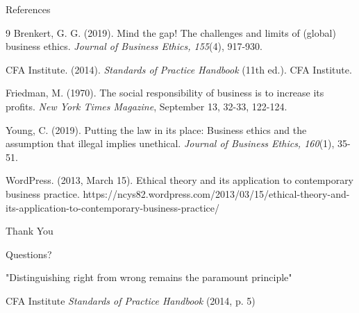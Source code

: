 \documentclass{beamer}
\renewcommand{\normalsize}{\fontsize{8pt}{10pt}\selectfont}
\renewcommand{\small}{\fontsize{7pt}{9pt}\selectfont}
\begin{document}
	\begin{frame}{References}
		\small
		\begin{thebibliography}{9}
			Brenkert, G. G. (2019). Mind the gap! The challenges and limits of (global) business ethics. \textit{Journal of Business Ethics, 155}(4), 917-930.
			
			CFA Institute. (2014). \textit{Standards of Practice Handbook} (11th ed.). CFA Institute.
			
			Friedman, M. (1970). The social responsibility of business is to increase its profits. \textit{New York Times Magazine}, September 13, 32-33, 122-124.
			
			Young, C. (2019). Putting the law in its place: Business ethics and the assumption that illegal implies unethical. \textit{Journal of Business Ethics, 160}(1), 35-51.
			
			WordPress. (2013, March 15). Ethical theory and its application to contemporary business practice. https://ncys82.wordpress.com/2013/03/15/ethical-theory-and-its-application-to-contemporary-business-practice/
		\end{thebibliography}
	\end{frame}
	
	\begin{frame}{Thank You}
		\begin{center}
			\Huge \textcolor{cfablue}{Questions?}
			
			\vspace{0.5cm}
			\Large \textcolor{cfagold}{"Distinguishing right from wrong remains the paramount principle"}
			
			\vspace{0.5cm}
			\normalsize CFA Institute \textit{Standards of Practice Handbook} (2014, p. 5)
		\end{center}
	\end{frame}
	
\end{document}
